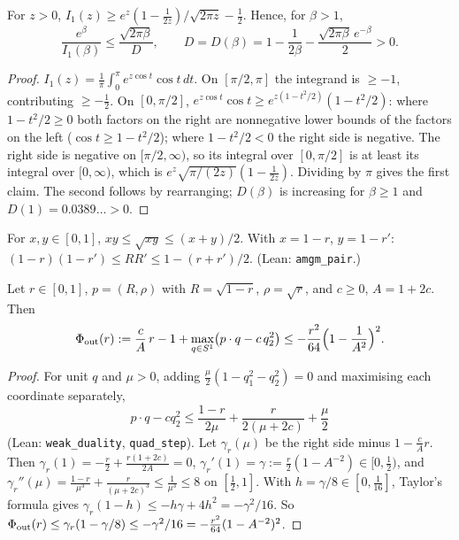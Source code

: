 \begin{lemma}\label{tu:U-I1}
For $z>0$, $I_1(z)\ge e^z(1-\frac1{2z})/\sqrt{2\pi z}-\frac12$. Hence, for $\beta>1$,
\[
\frac{e^\beta}{I_1(\beta)}\le\frac{\sqrt{2\pi\beta}}{D},\qquad D=D(\beta)=1-\frac1{2\beta}-\frac{\sqrt{2\pi\beta}\,e^{-\beta}}2>0 .
\]
\end{lemma}

\begin{proof}
$I_1(z)=\frac1\pi\int_0^\pi e^{z\cos t}\cos t\,dt$. On $[\pi/2,\pi]$ the integrand is $\ge-1$, contributing $\ge-\frac12$. On
$[0,\pi/2]$, $e^{z\cos t}\cos t\ge e^{z(1-t^2/2)}(1-t^2/2)$: where $1-t^2/2\ge0$ both factors on the right are
nonnegative lower bounds of the factors on the left ($\cos t\ge1-t^2/2$); where $1-t^2/2<0$ the right side is
negative. The right side is negative on $[\pi/2,\infty)$, so its integral over $[0,\pi/2]$ is at least its integral
over $[0,\infty)$, which is $e^z\sqrt{\pi/(2z)}(1-\frac1{2z})$. Dividing by $\pi$ gives the first claim. The second follows
by rearranging; $D(\beta)$ is increasing for $\beta\ge1$ and $D(1)=0.0389\ldots>0$.
\end{proof}

\begin{lemma}[AM--GM]\label{tu:U-amgm}
For $x,y\in[0,1]$, $xy\le\sqrt{xy}\le(x+y)/2$. With $x=1-r$, $y=1-r'$:
$(1-r)(1-r')\le RR'\le1-(r+r')/2$. (Lean: \texttt{amgm\_pair}.)
\end{lemma}

\begin{lemma}\label{tu:U-outer}
Let $r\in[0,1]$, $p=(R,\rho)$ with $R=\sqrt{1-r}$, $\rho=\sqrt r$, and $c\ge0$, $A=1+2c$. Then
\[
\Phi_{\rm out}(r):=\frac cA\,r-1+\max_{q\in S^1}\bigl(p\cdot q-c\,q_2^2\bigr)\le-\frac{r^2}{64}\Bigl(1-\frac1{A^2}\Bigr)^2 .
\]
\end{lemma}

\begin{proof}
For unit $q$ and $\mu>0$, adding $\frac\mu2(1-q_1^2-q_2^2)=0$ and maximising each coordinate separately,
\[
p\cdot q-cq_2^2\le\frac{1-r}{2\mu}+\frac{r}{2(\mu+2c)}+\frac\mu2
\]
(Lean: \texttt{weak\_duality}, \texttt{quad\_step}). Let $\gamma_r(\mu)$ be the right side minus $1-\frac cAr$. Then
$\gamma_r(1)=-\frac r2+\frac{r(1+2c)}{2A}=0$, $\gamma_r'(1)=\gamma:=\frac r2(1-A^{-2})\in[0,\frac12)$, and
$\gamma_r''(\mu)=\frac{1-r}{\mu^3}+\frac{r}{(\mu+2c)^3}\le\frac1{\mu^3}\le8$ on $[\frac12,1]$. With $h=\gamma/8\in[0,\frac1{16}]$,
Taylor's formula gives $\gamma_r(1-h)\le-h\gamma+4h^2=-\gamma^2/16$. So
$\Phi_{\rm out}(r)\le\gamma_r(1-\gamma/8)\le-\gamma^2/16=-\frac{r^2}{64}(1-A^{-2})^2$.
\end{proof}

